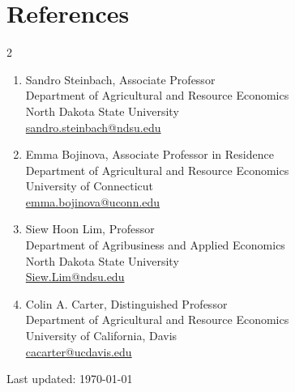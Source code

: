 \documentclass[10.8 pt,letterpaper]{article}
\begin{document}
	\newpage
	\section*{\textbf{References}}
	
	\begin{multicols}{2}
		\begin{enumerate}[leftmargin=0in]
			
			\item[] Sandro Steinbach, Associate Professor \\
			Department of Agricultural and Resource Economics \\
			North Dakota State University \\
			\href{mailto:sandro.steinbach@ndsu.edu}{sandro.steinbach@ndsu.edu}
			
			\item[] Emma Bojinova, Associate Professor in Residence \\
			Department of Agricultural and Resource Economics \\
			University of Connecticut \\
			\href{mailto:emma.bojinova@uconn.edu}{emma.bojinova@uconn.edu}
			
			\item[] Siew Hoon Lim, Professor \\
			Department of Agribusiness and Applied Economics \\
			North Dakota State University \\
			\href{mailto:Siew.Lim@ndsu.edu}{Siew.Lim@ndsu.edu}
			
			\item[] Colin A. Carter, Distinguished Professor \\
			Department of Agricultural and Resource Economics \\
			University of California, Davis \\
			\href{mailto:cacarter@ucdavis.edu}{cacarter@ucdavis.edu}
			
		\end{enumerate}
	\end{multicols}
	
	
	\vfill
	\begin{center}
		\begin{footnotesize}
			\raggedleft Last updated: \today
		\end{footnotesize}
	\end{center}
	
\end{document}
